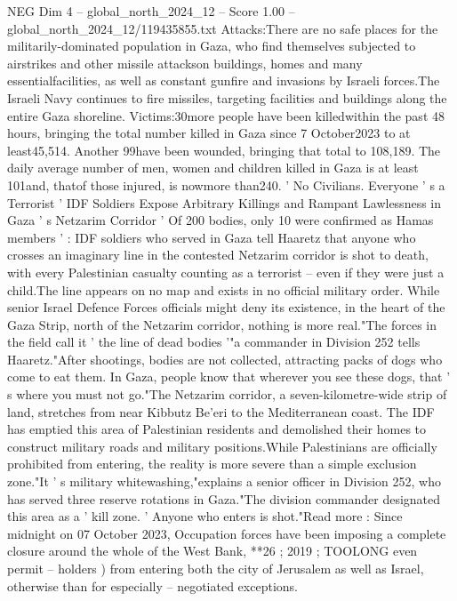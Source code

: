 \begin{textsample}{NEG Dim 4 – global\_north\_2024\_12 – Score 1.00 – global\_north\_2024\_12/119435855.txt}  \label{ex:f4_neg_159}
Attacks:There are no safe places for the militarily-dominated population in Gaza, who find themselves subjected to airstrikes and other missile attackson buildings, homes and many essentialfacilities, as well as constant gunfire and invasions by Israeli forces.The Israeli Navy continues to fire missiles, targeting facilities and buildings along the entire Gaza shoreline.
Victims:30more people have been killedwithin the past 48 hours, bringing the total number killed in Gaza since 7 October2023 to at least45,514.
Another 99have been wounded, bringing that total to 108,189.
The daily average number of men, women and children killed in Gaza is at least 101and, thatof those injured, is nowmore than240. ' No Civilians.
Everyone ' s a Terrorist ' IDF Soldiers Expose Arbitrary Killings and Rampant Lawlessness in Gaza ' s Netzarim Corridor ' Of 200 bodies, only 10 were confirmed as Hamas members ' : IDF soldiers who served in Gaza tell Haaretz that anyone who crosses an imaginary line in the contested Netzarim corridor is shot to death, with every Palestinian casualty counting as a terrorist -- even if they were just a child.The line appears on no map and exists in no official military order.
While senior Israel Defence Forces officials might deny its existence, in the heart of the Gaza Strip, north of the Netzarim corridor, nothing is more real."The forces in the field call it ' the line of dead bodies '"a commander in Division 252 tells Haaretz."After shootings, bodies are not collected, attracting packs of dogs who come to eat them.
In Gaza, people know that wherever you see these dogs, that ' s where you must not go."The Netzarim corridor, a seven-kilometre-wide strip of land, stretches from near Kibbutz Be'eri to the Mediterranean coast.
The IDF has emptied this area of Palestinian residents and demolished their homes to construct military roads and military positions.While Palestinians are officially prohibited from entering, the reality is more severe than a simple exclusion zone."It ' s military whitewashing,"explains a senior officer in Division 252, who has served three reserve rotations in Gaza."The division commander designated this area as a ' kill zone. ' Anyone who enters is shot."Read more : Since midnight on 07 October 2023, Occupation forces have been imposing a complete closure around the whole of the West Bank, **26 ; 2019 ; TOOLONG even permit -- holders ) from entering both the city of Jerusalem as well as Israel, otherwise than for especially -- negotiated exceptions.

\end{textsample}
